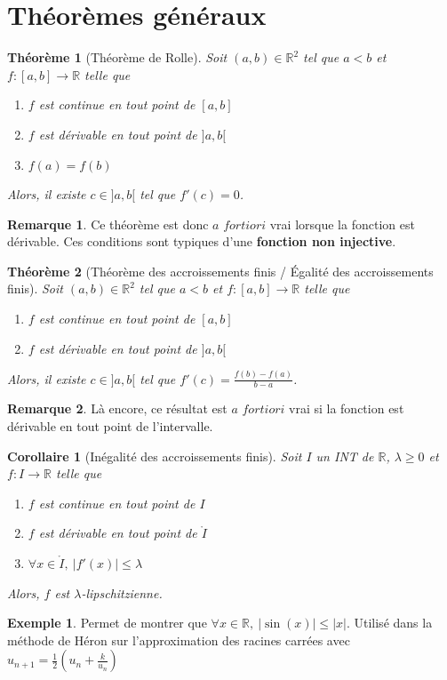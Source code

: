 \documentclass[french]{book}
\newcommand{\R}{\mathbb{R}}
\theoremstyle{plain}
\newtheorem{thm}{Théorème}[chapter]
\newtheorem{cor}{Corollaire}[chapter]
\theoremstyle{definition}
\newtheorem{exa}{Exemple}[chapter]
\newtheorem{rmq}{Remarque}[chapter]
\theoremstyle{remark}
\begin{document}
\section{Théorèmes généraux}
\begin{thm}[Théorème de Rolle]
	Soit $(a,b)\in\R^2$ tel que $a<b$ et $f:[a,b]\rightarrow\R$ telle que 
	\begin{enumerate}
		\item $f$ est continue en tout point de $[a,b]$
		\item $f$ est dérivable en tout point de $]a,b[$
		\item $f(a)=f(b)$
	\end{enumerate}
	Alors, il existe $c\in]a,b[$ tel que $f'(c)=0$.
\end{thm}
\begin{rmq} Ce théorème est donc $a$ $fortiori$ vrai lorsque la fonction est dérivable. Ces conditions sont typiques d'une \textbf{fonction non injective}. \end{rmq}
\begin{thm}[Théorème des accroissements finis / Égalité des accroissements finis]
	Soit $(a,b)\in\R^2$ tel que $a<b$ et $f:[a,b]\rightarrow\R$ telle que 
	\begin{enumerate}
		\item $f$ est continue en tout point de $[a,b]$
		\item $f$ est dérivable en tout point de $]a,b[$
	\end{enumerate}
	Alors, il existe $c\in]a,b[$ tel que $\displaystyle f'(c)=\frac{f(b)-f(a)}{b-a}$.
\end{thm}
\begin{rmq} Là encore, ce résultat est $a$ $fortiori$ vrai si la fonction est dérivable en tout point de l'intervalle. \end{rmq}
\begin{cor}[Inégalité des accroissements finis]
	Soit $I$ un INT de $\R$, $\lambda \geqslant 0$ et $f:I\rightarrow\R$ telle que 
	\begin{enumerate}
		\item $f$ est continue en tout point de $I$
		\item $f$ est dérivable en tout point de $\mathring{I}$
		\item $\forall x\in\mathring{I}, \ |f'(x)|\leqslant \lambda$
	\end{enumerate}
	Alors, $f$ est $\lambda$-lipschitzienne.
\end{cor}
\begin{exa}
	Permet de montrer que $\forall x \in\R, \ |\sin(x)|\leqslant|x|$. Utilisé dans la méthode de Héron sur l'approximation des racines carrées avec $u_{n+1}=\frac12(u_n+\frac{k}{u_n})$
\end{exa}
\end{document}
